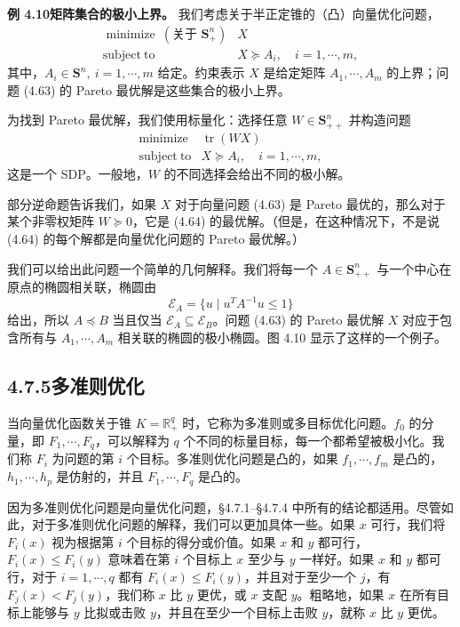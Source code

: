 \documentclass[UTF8,12pt,a4paper,fontset=fandol]{ctexart}
\begin{document}
\noindent\textbf{例 4.10\quad 矩阵集合的极小上界。}\quad
我们考虑关于半正定锥的（凸）向量优化问题，
\begin{equation}
\begin{array}{ll}
\mathop{\mathrm{minimize}}\ (\text{关于 }\mathbf{S}_+^n) & X\\
\mathrm{subject\ to} & X\succeq A_i,\quad i=1,\cdots,m,
\end{array}
\tag{4.63}
\end{equation}
其中，$A_i\in\mathbf{S}^n,\ i=1,\cdots,m$ 给定。约束表示 $X$ 是给定矩阵 $A_1,\cdots,A_m$ 的上界；问题 (4.63) 的 Pareto 最优解是这些集合的极小上界。

为找到 Pareto 最优解，我们使用标量化：选择任意 $W\in\mathbf{S}_{++}^n$ 并构造问题
\begin{equation}
\begin{array}{ll}
\mathop{\mathrm{minimize}} & \operatorname{tr}(WX)\\
\mathrm{subject\ to} & X\succeq A_i,\quad i=1,\cdots,m,
\end{array}
\tag{4.64}
\end{equation}
这是一个 SDP。一般地，$W$ 的不同选择会给出不同的极小解。

部分逆命题告诉我们，如果 $X$ 对于向量问题 (4.63) 是 Pareto 最优的，那么对于某个非零权矩阵 $W\succeq 0$，它是 (4.64) 的最优解。（但是，在这种情况下，不是说 (4.64) 的每个解都是向量优化问题的 Pareto 最优解。）

我们可以给出此问题一个简单的几何解释。我们将每一个 $A\in\mathbf{S}_{++}^n$ 与一个中心在原点的椭圆相关联，椭圆由
\[
\mathcal{E}_A=\{u\mid u^TA^{-1}u\leq 1\}
\]
给出，所以 $A\preceq B$ 当且仅当 $\mathcal{E}_A\subseteq\mathcal{E}_B$。问题 (4.63) 的 Pareto 最优解 $X$ 对应于包含所有与 $A_1,\cdots,A_m$ 相关联的椭圆的极小椭圆。图 4.10 显示了这样的一个例子。

\subsection*{4.7.5\quad 多准则优化}

当向量优化函数关于锥 $K=\mathbb{R}_+^q$ 时，它称为多准则或多目标优化问题。$f_0$ 的分量，即 $F_1,\cdots,F_q$，可以解释为 $q$ 个不同的标量目标，每一个都希望被极小化。我们称 $F_i$ 为问题的第 $i$ 个目标。多准则优化问题是凸的，如果 $f_1,\cdots,f_m$ 是凸的，$h_1,\cdots,h_p$ 是仿射的，并且 $F_1,\cdots,F_q$ 是凸的。

因为多准则优化问题是向量优化问题，\S 4.7.1--\S 4.7.4 中所有的结论都适用。尽管如此，对于多准则优化问题的解释，我们可以更加具体一些。如果 $x$ 可行，我们将 $F_i(x)$ 视为根据第 $i$ 个目标的得分或价值。如果 $x$ 和 $y$ 都可行，$F_i(x)\leq F_i(y)$ 意味着在第 $i$ 个目标上 $x$ 至少与 $y$ 一样好。如果 $x$ 和 $y$ 都可行，对于 $i=1,\cdots,q$ 都有 $F_i(x)\leq F_i(y)$，并且对于至少一个 $j$，有 $F_j(x)<F_j(y)$，我们称 $x$ 比 $y$ 更优，或 $x$ 支配 $y$。粗略地，如果 $x$ 在所有目标上能够与 $y$ 比拟或击败 $y$，并且在至少一个目标上击败 $y$，就称 $x$ 比 $y$ 更优。
\end{document}
